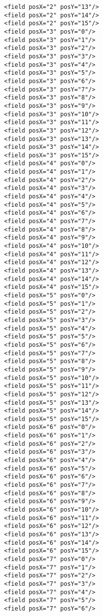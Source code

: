 \documentclass[12pt,a4paper, ngerman, oneside]{scrartcl}
\begin{document}
\begin{enumerate}
\begin{verbatim}
        <field posX="2" posY="13"/>
        <field posX="2" posY="14"/>
        <field posX="2" posY="15"/>
        <field posX="3" posY="0"/>
        <field posX="3" posY="1"/>
        <field posX="3" posY="2"/>
        <field posX="3" posY="3"/>
        <field posX="3" posY="4"/>
        <field posX="3" posY="5"/>
        <field posX="3" posY="6"/>
        <field posX="3" posY="7"/>
        <field posX="3" posY="8"/>
        <field posX="3" posY="9"/>
        <field posX="3" posY="10"/>
        <field posX="3" posY="11"/>
        <field posX="3" posY="12"/>
        <field posX="3" posY="13"/>
        <field posX="3" posY="14"/>
        <field posX="3" posY="15"/>
        <field posX="4" posY="0"/>
        <field posX="4" posY="1"/>
        <field posX="4" posY="2"/>
        <field posX="4" posY="3"/>
        <field posX="4" posY="4"/>
        <field posX="4" posY="5"/>
        <field posX="4" posY="6"/>
        <field posX="4" posY="7"/>
        <field posX="4" posY="8"/>
        <field posX="4" posY="9"/>
        <field posX="4" posY="10"/>
        <field posX="4" posY="11"/>
        <field posX="4" posY="12"/>
        <field posX="4" posY="13"/>
        <field posX="4" posY="14"/>
        <field posX="4" posY="15"/>
        <field posX="5" posY="0"/>
        <field posX="5" posY="1"/>
        <field posX="5" posY="2"/>
        <field posX="5" posY="3"/>
        <field posX="5" posY="4"/>
        <field posX="5" posY="5"/>
        <field posX="5" posY="6"/>
        <field posX="5" posY="7"/>
        <field posX="5" posY="8"/>
        <field posX="5" posY="9"/>
        <field posX="5" posY="10"/>
        <field posX="5" posY="11"/>
        <field posX="5" posY="12"/>
        <field posX="5" posY="13"/>
        <field posX="5" posY="14"/>
        <field posX="5" posY="15"/>
        <field posX="6" posY="0"/>
        <field posX="6" posY="1"/>
        <field posX="6" posY="2"/>
        <field posX="6" posY="3"/>
        <field posX="6" posY="4"/>
        <field posX="6" posY="5"/>
        <field posX="6" posY="6"/>
        <field posX="6" posY="7"/>
        <field posX="6" posY="8"/>
        <field posX="6" posY="9"/>
        <field posX="6" posY="10"/>
        <field posX="6" posY="11"/>
        <field posX="6" posY="12"/>
        <field posX="6" posY="13"/>
        <field posX="6" posY="14"/>
        <field posX="6" posY="15"/>
        <field posX="7" posY="0"/>
        <field posX="7" posY="1"/>
        <field posX="7" posY="2"/>
        <field posX="7" posY="3"/>
        <field posX="7" posY="4"/>
        <field posX="7" posY="5"/>
        <field posX="7" posY="6"/>

\end{verbatim}
\end{enumerate}
\end{document}
